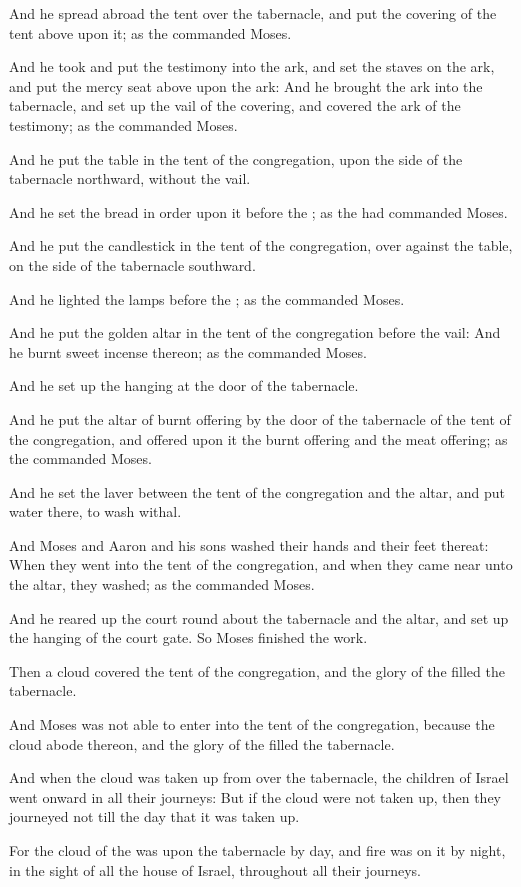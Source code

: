 \Verse And he spread abroad the tent over the tabernacle, and put the covering of the tent above upon it; as the \LORD commanded Moses.

\Verse And he took and put the testimony into the ark, and set the staves on the ark, and put the mercy seat above upon the ark: \Verse And he brought the ark into the tabernacle, and set up the vail of the covering, and covered the ark of the testimony; as the \LORD commanded Moses.

\Verse And he put the table in the tent of the congregation, upon the side of the tabernacle northward, without the vail.

\Verse And he set the bread in order upon it before the \LORD; as the \LORD had commanded Moses.

\Verse And he put the candlestick in the tent of the congregation, over against the table, on the side of the tabernacle southward.

\Verse And he lighted the lamps before the \LORD; as the \LORD commanded Moses.

\Verse And he put the golden altar in the tent of the congregation before the vail: \Verse And he burnt sweet incense thereon; as the \LORD commanded Moses.

\Verse And he set up the hanging at the door of the tabernacle.

\Verse And he put the altar of burnt offering by the door of the tabernacle of the tent of the congregation, and offered upon it the burnt offering and the meat offering; as the \LORD commanded Moses.

\Verse And he set the laver between the tent of the congregation and the altar, and put water there, to wash withal.

\Verse And Moses and Aaron and his sons washed their hands and their feet thereat: \Verse When they went into the tent of the congregation, and when they came near unto the altar, they washed; as the \LORD commanded Moses.

\Verse And he reared up the court round about the tabernacle and the altar, and set up the hanging of the court gate. So Moses finished the work.

\Verse Then a cloud covered the tent of the congregation, and the glory of the \LORD filled the tabernacle.

\Verse And Moses was not able to enter into the tent of the congregation, because the cloud abode thereon, and the glory of the \LORD filled the tabernacle.

\Verse And when the cloud was taken up from over the tabernacle, the children of Israel went onward in all their journeys: \Verse But if the cloud were not taken up, then they journeyed not till the day that it was taken up.

\Verse For the cloud of the \LORD was upon the tabernacle by day, and fire was on it by night, in the sight of all the house of Israel, throughout all their journeys.

